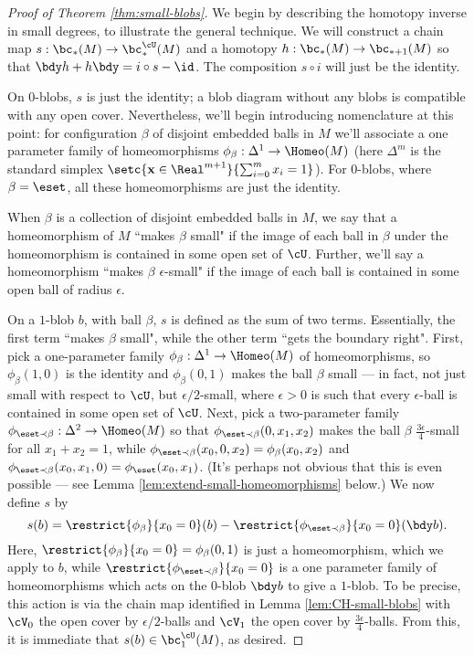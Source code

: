 \begin{proof}[Proof of Theorem \ref{thm:small-blobs}]
We begin by describing the homotopy inverse in small degrees, to illustrate the general technique.
We will construct a chain map $s:  \bc_*(M) \to \bc^{\cU}_*(M)$ and a homotopy $h:\bc_*(M) \to \bc_{*+1}(M)$ so that $\bdy h+h \bdy=i\circ s - \id$. The composition $s \circ i$ will just be the identity.

On $0$-blobs, $s$ is just the identity; a blob diagram without any blobs is compatible with any open cover. 
Nevertheless, we'll begin introducing nomenclature at this point: for configuration $\beta$ of disjoint embedded balls in $M$ we'll associate a one parameter family of homeomorphisms $\phi_\beta : \Delta^1 \to \Homeo(M)$ (here $\Delta^m$ is the standard simplex $\setc{\mathbf{x} \in \Real^{m+1}}{\sum_{i=0}^m x_i = 1}$). For $0$-blobs, where $\beta = \eset$, all these homeomorphisms are just the identity.

When $\beta$ is a collection of disjoint embedded balls in $M$, we say that a homeomorphism of $M$ ``makes $\beta$ small" if the image of each ball in $\beta$ under the homeomorphism is contained in some open set of $\cU$. Further, we'll say a homeomorphism ``makes $\beta$ $\epsilon$-small" if the image of each ball is contained in some open ball of radius $\epsilon$.

On a $1$-blob $b$, with ball $\beta$, $s$ is defined as the sum of two terms. Essentially, the first term ``makes $\beta$ small", while the other term ``gets the boundary right". First, pick a one-parameter family $\phi_\beta : \Delta^1 \to \Homeo(M)$ of homeomorphisms, so $\phi_\beta(1,0)$ is the identity and $\phi_\beta(0,1)$ makes the ball $\beta$ small --- in fact, not just small with respect to $\cU$, but $\epsilon/2$-small, where $\epsilon > 0$ is such that every $\epsilon$-ball is contained in some open set of $\cU$. Next, pick a two-parameter family $\phi_{\eset \prec \beta} : \Delta^2 \to \Homeo(M)$ so that $\phi_{\eset \prec \beta}(0,x_1,x_2)$ makes the ball $\beta$ $\frac{3\epsilon}{4}$-small for all $x_1+x_2=1$, while $\phi_{\eset \prec \beta}(x_0,0,x_2) = \phi_\beta(x_0,x_2)$ and $\phi_{\eset \prec \beta}(x_0,x_1,0) = \phi_\eset(x_0,x_1)$. (It's perhaps not obvious that this is even possible --- see Lemma \ref{lem:extend-small-homeomorphisms} below.) We now define $s$ by
$$s(b) = \restrict{\phi_\beta}{x_0=0}(b) - \restrict{\phi_{\eset \prec \beta}}{x_0=0}(\bdy b).$$
Here, $\restrict{\phi_\beta}{x_0=0} = \phi_\beta(0,1)$ is just a homeomorphism, which we apply to $b$, while $\restrict{\phi_{\eset \prec \beta}}{x_0=0}$ is a one parameter family of homeomorphisms which acts on the $0$-blob $\bdy b$ to give a $1$-blob. To be precise, this action is via the chain map identified in Lemma \ref{lem:CH-small-blobs} with $\cV_0$ the open cover by $\epsilon/2$-balls and $\cV_1$ the open cover by $\frac{3\epsilon}{4}$-balls. From this, it is immediate that $s(b) \in \bc^{\cU}_1(M)$, as desired.


\end{proof}
